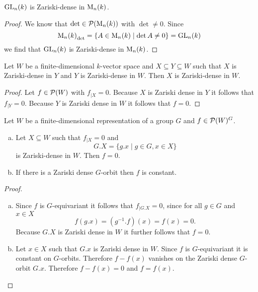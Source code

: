 \begin{cor}
 $\operatorname{GL}_n(k)$ is Zariski-dense in $\operatorname{M}_n(k)$.
\end{cor}
\begin{proof}
 We know that $\det \in \mathcal{P}(\operatorname{M}_n(k))$ with $\det \neq 0$. Since
 \[
  {\operatorname{M}_n(k)}_{\det} = \{A \in \operatorname{M}_n(k) \mid \det A \neq 0\} = \operatorname{GL}_n(k)
 \]
 we find that $\operatorname{GL}_n(k)$ is Zariski-dense in $\operatorname{M}_n(k)$.
\end{proof}


\begin{prop}
 Let $W$ be a finite-dimensional $k$-vector space and $X \subseteq Y \subseteq W$ such that $X$ is Zariski-dense in $Y$ and $Y$ is Zariski-dense in $W$. Then $X$ is Zariski-dense in $W$.
\end{prop}
\begin{proof}
 Let $f \in \mathcal{P}(W)$ with $f_{|X} = 0$. Because $X$ is Zariski dense in $Y$ it follows that $f_{|Y} = 0$. Because $Y$ is Zariski dense in $W$ it follows that $f = 0$.
\end{proof}


\begin{lem}
 Let $W$ be a finite-dimensional representation of a group $G$ and $f \in \mathcal{P}(W)^G$.
 \begin{enumerate}[a)]
  \item
  Let $X \subseteq W$ such that $f_{|X} = 0$ and
  \[
   G.X = \{g.x \mid g \in G, x \in X\}
  \]
  is Zariski-dense in $W$. Then $f = 0$.
  \item
  If there is a Zariski dense $G$-orbit then $f$ is constant.
 \end{enumerate}
\end{lem}
\begin{proof}\leavevmode
 \begin{enumerate}[a)]
  \item
  Since $f$ is $G$-equivariant it follows that $f_{|G.X} = 0$, since for all $g \in G$ and $x \in X$
  \[
   f(g.x) = \left(g^{-1}.f\right)(x) = f(x) = 0.
  \]
  Because $G.X$ is Zariski dense in $W$ it further follows that $f = 0$.
  \item
  Let $x \in X$ such that $G.x$ is Zariski dense in $W$. Since $f$ is $G$-equivariant it is constant on $G$-orbits. Therefore $f-f(x)$ vanishes on the Zariski dense $G$-orbit $G.x$. Therefore $f-f(x) = 0$ and $f = f(x)$.
 \end{enumerate}
\end{proof}


